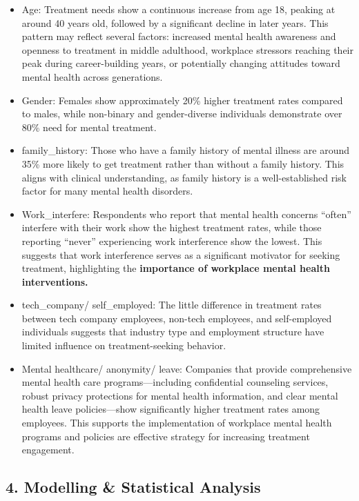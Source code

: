 \documentclass[
]{article}
\providecommand{\tightlist}{%
  \setlength{\itemsep}{0pt}\setlength{\parskip}{0pt}}
\begin{document}
\begin{itemize}
\tightlist
\item
  Age: Treatment needs show a continuous increase from age 18, peaking
  at around 40 years old, followed by a significant decline in later
  years. This pattern may reflect several factors: increased mental
  health awareness and openness to treatment in middle adulthood,
  workplace stressors reaching their peak during career-building years,
  or potentially changing attitudes toward mental health across
  generations.
\item
  Gender: Females show approximately 20\% higher treatment rates
  compared to males, while non-binary and gender-diverse individuals
  demonstrate over 80\% need for mental treatment.
\item
  family\_history: Those who have a family history of mental illness are
  around 35\% more likely to get treatment rather than without a family
  history. This aligns with clinical understanding, as family history is
  a well-established risk factor for many mental health disorders.
\item
  Work\_interfere: Respondents who report that mental health concerns
  ``often'' interfere with their work show the highest treatment rates,
  while those reporting ``never'' experiencing work interference show
  the lowest. This suggests that work interference serves as a
  significant motivator for seeking treatment, highlighting the
  \textbf{importance of workplace mental health interventions.}
\item
  tech\_company/ self\_employed: The little difference in treatment
  rates between tech company employees, non-tech employees, and
  self-employed individuals suggests that industry type and employment
  structure have limited influence on treatment-seeking behavior.
\item
  Mental healthcare/ anonymity/ leave: Companies that provide
  comprehensive mental health care programs---including confidential
  counseling services, robust privacy protections for mental health
  information, and clear mental health leave policies---show
  significantly higher treatment rates among employees. This supports
  the implementation of workplace mental health programs and policies
  are effective strategy for increasing treatment engagement.
\end{itemize}

\subsection{\texorpdfstring{\textbf{4. Modelling \& Statistical
Analysis}}{4. Modelling \& Statistical Analysis}}\label{modelling-statistical-analysis}
\end{document}
